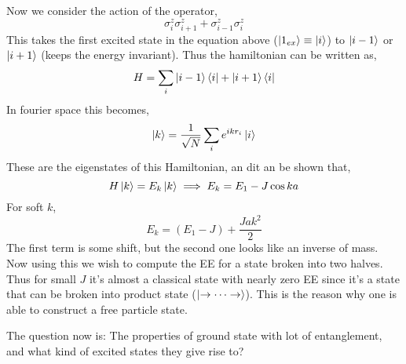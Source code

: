 \documentclass[a4paper,11pt]{article}
\def\s{\sigma}
\begin{document}
Now we consider the action of the operator, 
\begin{equation*}
\s_i^z \s_{i+1}^z + \s_{i-1}^z \s_i^z 
\end{equation*}
This takes the first excited state in the equation above ($\ket{1_{ex}} \equiv \ket{i}$) to $\ket{i-1}$ or $\ket{i+1}$ (keeps the energy invariant). Thus the hamiltonian can be written as, 
\begin{equation*}
H = \sum_i \ket{i-1} \bra{i} + \ket{i+1}\bra{i}
\end{equation*}
In fourier space this becomes,
\begin{equation*}
\ket{k} = \frac{1}{\sqrt N} \sum_i e^{i k r_i} \ket{i}
\end{equation*}
These are the eigenstates of this Hamiltonian, an dit an be shown that, 
\begin{equation*}
H \ket{k} = E_k \ket{k} \implies E_k = E_1 - J \cos ka
\end{equation*}
For soft $k$, 
\begin{equation*}
E_k = (E_1 - J) + \frac{J a k^2}{2}
\end{equation*}
The first term is some shift, but the second one looks like an inverse of mass. Now using this we wish to compute the EE for a state broken into two halves. Thus for small $J$ it's almost a classical state with nearly zero EE since it's a state that can be broken into product state ($\ket{\rightarrow \cdots \rightarrow}$). This is the reason why one is able to construct a free particle state. 

The question now is: The properties of ground state with lot of entanglement, and what kind of excited states they give rise to? 
\end{document}
